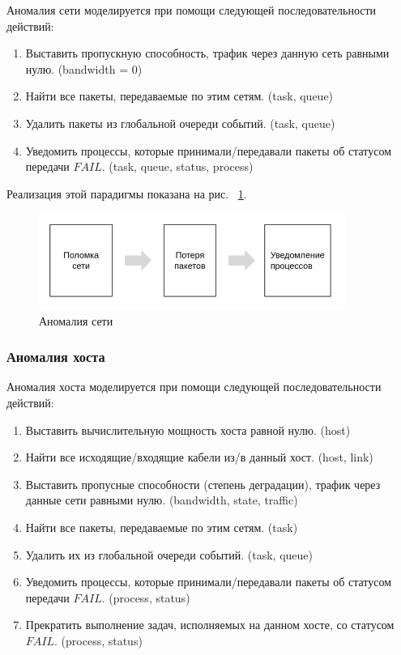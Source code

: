Аномалия сети моделируется при помощи следующей последовательности действий:

\begin{enumerate}
\item Выставить пропускную способность, трафик через данную сеть равными нулю. (bandwidth = 0)
\item Найти все пакеты, передаваемые по этим сетям. (task, queue)
\item Удалить пакеты из глобальной очереди событий. (task, queue)
\item Уведомить процессы, которые принимали/передавали пакеты об статусом передачи $FAIL$. (task, queue, status, process)
\end{enumerate}

Реализация этой парадигмы показана на рис. ~\ref{fig:anom-link}.

\begin{figure}[!ht]
\centering
\includegraphics[width=10cm]{Kenenbek/images/anom-scheme-link.png}
\caption{Аномалия сети}
\label{fig:anom-link}
\end{figure}

\subsubsection{Аномалия хоста}

Аномалия хоста моделируется при помощи следующей последовательности действий:

\begin{enumerate}
\item Выставить вычислительную мощность хоста равной нулю. (host)
\item Найти все исходящие/входящие кабели из/в данный хост. (host, link)
\item Выставить пропусные способности (степень деградации), трафик через данные сети равными нулю. (bandwidth, state, traffic)
\item Найти все пакеты, передаваемые по этим сетям. (task)
\item Удалить их из глобальной очереди событий. (task, queue)
\item Уведомить процессы, которые принимали/передавали пакеты об статусом передачи $FAIL$. (process, status)
\item Прекратить выполнение задач, исполняемых на данном хосте, со статусом $FAIL$. (process, status)

\end{enumerate}

